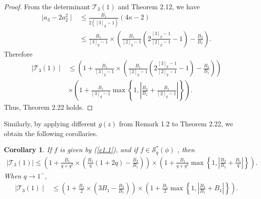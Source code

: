 \documentclass[11pt,twoside, reqno]{article}
\newtheorem{corollary}[theorem]{Corollary}
\theoremstyle{definition}
\begin{document}
\begin{proof}
From the determinant $\mathcal{T}_3(1)$ and Theorem 2.12, we have
\begin{align}\nonumber
\mid a_{3}-2a_{2}^{2}\mid & \leq \frac{B_{1}}{2([3]_{g}-1)}(4\kappa - 2) \\\nonumber
&\leq\frac{B_{1}}{[3]_{g}-1}\times\left(\frac{B_{1}}{[2]_{g}-1}\left(2\frac{[3]_{g}-1}{[2]_{g}-1}-1\right)-\frac{B_{2}}{B_{1}}\right).
\end{align}
Therefore
\begin{align}\nonumber
\mid \mathcal{T}_3(1)\mid &\leq \left(1+\frac{B_{1}}{[3]_{g}-1}\times\left(\frac{B_{1}}{[2]_{g}-1}\left(2\frac{[3]_{g}-1}{[2]_{g}-1}-1\right)-\frac{B_{2}}{B_{1}}\right)\right)\\\nonumber
&\times\left(1+\frac{B_{1}}{[3]_{g}-1}\max\left\{1, \left|\frac{B_{2}}{B_{1}}+\frac{B_{1}}{[2]_{g}-1}\right|\right\}\right).
\end{align}
Thus, Theorem 2.22 holds.
\end{proof}
Similarly, by applying different $g(z)$ from Remark 1.2 to Theorem 2.22, we obtain the following corollaries.
\begin{corollary}
If $f$ is given by (\ref{e1.1}),  and if $f\in\mathcal{S}^{\ast }_{q}(\phi)$ , then
\begin{align}\nonumber
\mid \mathcal{T}_3(1)\mid \leq \left(1+\frac{B_{1}}{q+q^{2}}\times\left(\frac{B_{1}}{q}\left(1+2q\right)-\frac{B_{2}}{B_{1}}\right)\right)\nonumber
\times\left(1+\frac{B_{1}}{q+q^{2}}\max\left\{1, \left|\frac{B_{2}}{B_{1}}+\frac{B_{1}}{q}\right|\right\}\right).
\end{align}
When $q\rightarrow1^{-}$,
\begin{align}\nonumber
\mid \mathcal{T}_3(1)\mid &\leq \left(1+\frac{B_{1}}{2}\times\left(3B_{1}-\frac{B_{2}}{B_{1}}\right)\right)
\times\left(1+\frac{B_{1}}{2}\max\left\{1, \left|\frac{B_{2}}{B_{1}}+B_{1}\right|\right\}\right).
\end{align}
\end{corollary}
\end{document}
